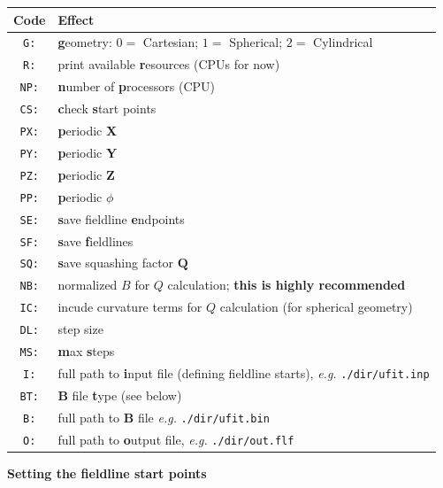 \documentclass[12pt,twoside]{article}
\begin{document}
\begin{tabular}{|c|l|}		
		\hline
		\textbf{Code} & \textbf{Effect} \\\hline\hline
		\texttt{G:} & \textbf{g}eometry: $0 =$ Cartesian; $1 =$ Spherical; $2 =$ Cylindrical  \\\hline
		\texttt{R:} & print available \textbf{r}esources (CPUs for now) \\\hline
		\texttt{NP:} &  \textbf{n}umber of \textbf{p}rocessors (CPU) \\\hline
		\texttt{CS:} & \textbf{c}heck \textbf{s}tart points \\\hline
		\texttt{PX:} & \textbf{p}eriodic \textbf{X} \\\hline
		\texttt{PY:} & \textbf{p}eriodic \textbf{Y}  \\\hline
		\texttt{PZ:} & \textbf{p}eriodic \textbf{Z}  \\\hline
		\texttt{PP:} & \textbf{p}eriodic $\phi$  \\\hline
		\texttt{SE:} & \textbf{s}ave fieldline \textbf{e}ndpoints \\\hline
		\texttt{SF:} & \textbf{s}ave \textbf{f}ieldlines \\\hline
		\texttt{SQ:} & \textbf{s}ave squashing factor $\mathbf{Q}$  \\\hline
		\texttt{NB:} & normalized $B$ for $Q$ calculation; \textbf{this is highly recommended} \\\hline
		\texttt{IC:} & incude curvature terms for $Q$ calculation (for spherical geometry) \\\hline
		\texttt{DL:} & step size \\\hline
		\texttt{MS:} & \textbf{m}ax \textbf{s}teps  \\\hline
		\texttt{I:} & full path to \textbf{i}nput file (defining fieldline starts), \textit{e.g.} \texttt{./dir/ufit.inp} \\\hline
		\texttt{BT:} & $\mathbf{B}$ file \textbf{t}ype (see below) \\\hline
		\texttt{B:} & full path to $\mathbf{B}$ file \textit{e.g.} \texttt{./dir/ufit.bin} \\\hline
		\texttt{O:} & full path to \textbf{o}utput file, \textit{e.g.} \texttt{./dir/out.flf} \\\hline

\end{tabular}


\vspace{2mm}
{\Large \textbf{Setting the fieldline start points}}
\end{document}
